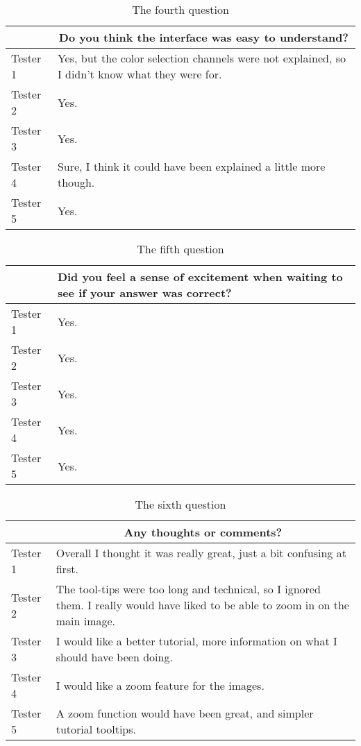 \begin{table}[H]
\centering
\caption{The fourth question}
\label{tab:question4}
\begin{tabular}{p{1.3cm}p{10cm}}
\toprule
 & \multicolumn{1}{c}{Do you think the interface was easy to understand?} \\ \midrule
Tester 1 & Yes, but the color selection channels were not explained, so I didn't know what they were for. \\
Tester 2 & Yes. \\
Tester 3 & Yes. \\
Tester 4 & Sure, I think it could have been explained a little more though. \\
Tester 5 & Yes. \\ \bottomrule
\end{tabular}
\end{table}

\begin{table}[H]
\centering
\caption{The fifth question}
\label{tab:question5}
\begin{tabular}{p{1.3cm}p{10cm}}
\toprule
 & Did you feel a sense of excitement when waiting to see if your answer was correct? \\ \midrule
Tester 1 & Yes. \\
Tester 2 & Yes. \\
Tester 3 & Yes. \\
Tester 4 & Yes. \\
Tester 5 & Yes. \\ \bottomrule
\end{tabular}
\end{table}

\begin{table}[H]
\centering
\caption{The sixth question}
\label{tab:question6}
\begin{tabular}{p{1.3cm}p{10cm}}
\toprule
 & \multicolumn{1}{c}{Any thoughts or comments?} \\ \midrule
Tester 1 & Overall I thought it was really great, just a bit confusing at first. \\
Tester 2 & The tool-tips were too long and technical, so I ignored them. I really would have liked to be able to zoom in on the main image. \\
Tester 3 & I would like a better tutorial, more information on what I should have been doing. \\
Tester 4 & I would like a zoom feature for the images. \\
Tester 5 & A zoom function would have been great, and simpler tutorial tooltips. \\ \bottomrule
\end{tabular}
\end{table}

